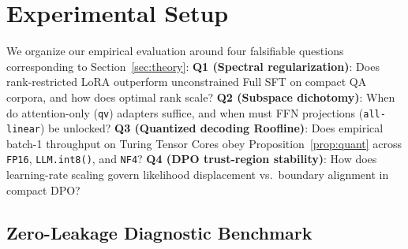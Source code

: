 \documentclass[10pt,a4paper,twocolumn]{article}
\begin{document}
\section{Experimental Setup}
\label{sec:experiments}

We organize our empirical evaluation around four falsifiable questions corresponding to Section~\ref{sec:theory}: \textbf{Q1 (Spectral regularization)}: Does rank-restricted LoRA outperform unconstrained Full SFT on compact QA corpora, and how does optimal rank scale? \textbf{Q2 (Subspace dichotomy)}: When do attention-only (\texttt{qv}) adapters suffice, and when must FFN projections (\texttt{all-linear}) be unlocked? \textbf{Q3 (Quantized decoding Roofline)}: Does empirical batch-1 throughput on Turing Tensor Cores obey Proposition~\ref{prop:quant} across \texttt{FP16}, \texttt{LLM.int8()}, and \texttt{NF4}? \textbf{Q4 (DPO trust-region stability)}: How does learning-rate scaling govern likelihood displacement vs.\ boundary alignment in compact DPO?

\subsection{Zero-Leakage Diagnostic Benchmark}
\end{document}
